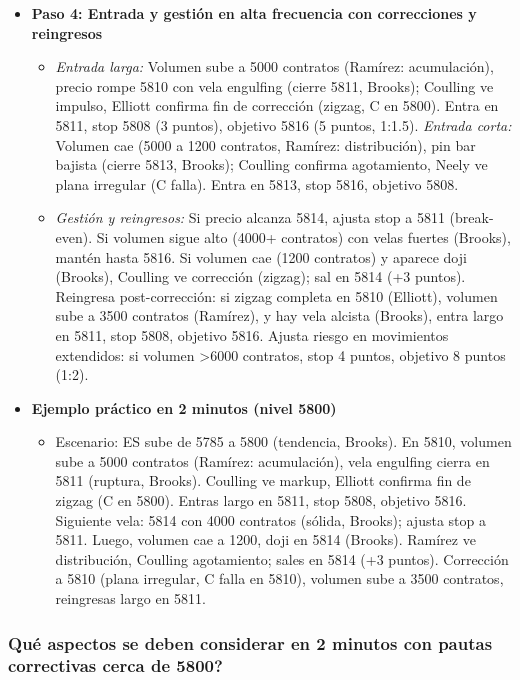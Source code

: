 \begin{itemize}
    \item \textbf{Paso 4: Entrada y gesti\'{o}n en alta frecuencia con correcciones y reingresos}
    \begin{itemize}
        \item \textit{Entrada larga:} Volumen sube a 5000 contratos (Ram\'irez: acumulaci\'{o}n), precio rompe 5810 con vela engulfing (cierre 5811, Brooks); Coulling ve impulso, Elliott confirma fin de correcci\'{o}n (zigzag, C en 5800). Entra en 5811, stop 5808 (3 puntos), objetivo 5816 (5 puntos, 1:1.5). \textit{Entrada corta:} Volumen cae (5000 a 1200 contratos, Ram\'irez: distribuci\'{o}n), pin bar bajista (cierre 5813, Brooks); Coulling confirma agotamiento, Neely ve plana irregular (C falla). Entra en 5813, stop 5816, objetivo 5808.

        \item \textit{Gesti\'{o}n y reingresos:} Si precio alcanza 5814, ajusta stop a 5811 (break-even). Si volumen sigue alto (4000+ contratos) con velas fuertes (Brooks), mant\'en hasta 5816. Si volumen cae (1200 contratos) y aparece doji (Brooks), Coulling ve correcci\'{o}n (zigzag); sal en 5814 (+3 puntos). Reingresa post-correcci\'{o}n: si zigzag completa en 5810 (Elliott), volumen sube a 3500 contratos (Ram\'irez), y hay vela alcista (Brooks), entra largo en 5811, stop 5808, objetivo 5816. Ajusta riesgo en movimientos extendidos: si volumen >6000 contratos, stop 4 puntos, objetivo 8 puntos (1:2).
    \end{itemize}

    \item \textbf{Ejemplo pr\'{a}ctico en 2 minutos (nivel 5800)}
    \begin{itemize}
        \item Escenario: ES sube de 5785 a 5800 (tendencia, Brooks). En 5810, volumen sube a 5000 contratos (Ram\'irez: acumulaci\'{o}n), vela engulfing cierra en 5811 (ruptura, Brooks). Coulling ve markup, Elliott confirma fin de zigzag (C en 5800). Entras largo en 5811, stop 5808, objetivo 5816. Siguiente vela: 5814 con 4000 contratos (s\'olida, Brooks); ajusta stop a 5811. Luego, volumen cae a 1200, doji en 5814 (Brooks). Ram\'irez ve distribuci\'{o}n, Coulling agotamiento; sales en 5814 (+3 puntos). Correcci\'{o}n a 5810 (plana irregular, C falla en 5810), volumen sube a 3500 contratos, reingresas largo en 5811.
    \end{itemize}
\end{itemize}

\subsubsection{\textquestiondown Qu\'{e} aspectos se deben considerar en 2 minutos con pautas correctivas cerca de 5800?}

